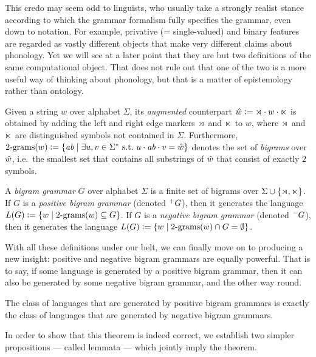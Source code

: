 This credo may seem odd to linguists, who usually take a strongly realist stance according to which the grammar formalism fully specifies the grammar, even down to notation.
For example, privative (= single-valued) and binary features are regarded as vastly different objects that make very different claims about phonology.
Yet we will see at a later point that they are but two definitions of the same computational object.
That does not rule out that one of the two is a more useful way of thinking about phonology, but that is a matter of epistemology rather than ontology.

\begin{definition}[Bigrams]
    Given a string $w$ over alphabet $\Sigma$, its \emph{augmented} counterpart $\hat{w} \mathrel{\mathop:}= \rtimes \cdot w \cdot \ltimes$ is obtained by adding the left and right edge markers $\rtimes$ and $\ltimes$ to $w$, where $\rtimes$ and $\ltimes$ are distinguished symbols not contained in $\Sigma$.
    Furthermore, 
    \(
    2\mathrm{\text{-}grams}(w) \mathrel{\mathop:}=
        \left \{ 
            \mathit{ab} \mid \exists u,v \in \Sigma^* \text{ s.t.\ }
                u \cdot \mathit{ab} \cdot v = \hat{w}
         \right \}
    \)
    denotes the set of \emph{bigrams} over $\hat{w}$, i.e.\ the smallest set that contains all substrings of $\hat{w}$ that consist of exactly $2$ symbols.
\end{definition}

\begin{definition}
    A \emph{bigram grammar} $G$ over alphabet $\Sigma$ is a finite set of bigrams over $\Sigma \cup \left \{ \rtimes, \ltimes \right \}$.
    If $G$ is a \emph{positive bigram grammar} (denoted $^+ G$), then it generates the language
    \(
        L(G) \mathrel{\mathop:}= \left \{ 
            w \mid 2\mathrm{\text{-}grams}(w) \subseteq G
         \right \}
    \).
    If $G$ is a \emph{negative bigram grammar} (denoted $^- G$), then it generates the language
    \(
        L(G) \mathrel{\mathop:}= \left \{ 
            w \mid 2\mathrm{\text{-}grams}(w) \cap G = \emptyset
         \right \}
    \).
\end{definition}

With all these definitions under our belt, we can finally move on to producing a new insight: positive and negative bigram grammars are equally powerful.
That is to say, if some language is generated by a positive bigram grammar, then it can also be generated by some negative bigram grammar, and the other way round.

\begin{theorem}
    The class of languages that are generated by positive bigram grammars is exactly the class of languages that are generated by negative bigram grammars.
    \label{thm:SL_PosNegEquivalence}
\end{theorem}
%
In order to show that this theorem is indeed correct, we establish two simpler propositions --- called lemmata --- which jointly imply the theorem.

